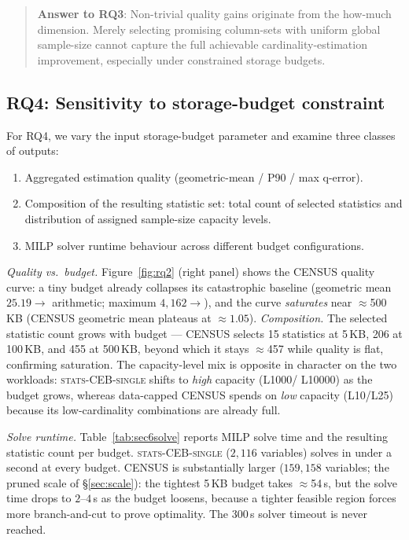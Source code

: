 \documentclass[sigconf, nonacm]{acmart}
\begin{document}
\begin{quote}
\noindent\textbf{Answer to RQ3}:
Non-trivial quality gains originate from the how-much dimension.
Merely selecting promising column-sets with uniform global sample-size cannot capture the full achievable cardinality-estimation improvement, especially under constrained storage budgets.
\end{quote}

\subsection{RQ4: Sensitivity to storage-budget constraint}
\label{sec:rq4}

For RQ4, we vary the input storage-budget parameter and examine three classes of outputs:
\begin{enumerate}
    \item Aggregated estimation quality (geometric-mean / P90 / max q-error).
    \item Composition of the resulting statistic set: total count of selected statistics and distribution of assigned sample-size capacity levels.
    \item MILP solver runtime behaviour across different budget configurations.
\end{enumerate}

\emph{Quality vs.\ budget.} Figure~\ref{fig:rq2} (right panel) shows the
CENSUS quality curve: a tiny budget already collapses its catastrophic
baseline (geometric mean $25.19\!\to$ arithmetic; maximum $4{,}162\!\to$), and
the curve \emph{saturates} near $\approx$500\,KB (CENSUS geometric mean plateaus
at $\approx1.05$). \emph{Composition.} The selected statistic count grows with
budget --- CENSUS selects 15 statistics at 5\,KB, 206 at 100\,KB, and 455 at
500\,KB, beyond which it stays $\approx$457 while quality is flat, confirming
saturation. The capacity-level mix is opposite in character on the two
workloads: \textsc{stats-CEB-single} shifts to \emph{high} capacity (L1000/
L10000) as the budget grows, whereas data-capped CENSUS spends on
\emph{low} capacity (L10/L25) because its low-cardinality combinations are
already full.

\emph{Solve runtime.} Table~\ref{tab:sec6solve} reports MILP solve time and the
resulting statistic count per budget. \textsc{stats-CEB-single} ($2{,}116$
variables) solves in under a second at every budget. CENSUS is substantially
larger ($159{,}158$ variables; the pruned scale of \S\ref{sec:scale}): the
tightest 5\,KB budget takes $\approx$54\,s, but the solve time drops to
$2$--$4$\,s as the budget loosens, because a tighter feasible region forces more
branch-and-cut to prove optimality. The 300\,s solver timeout is never reached.
\end{document}
